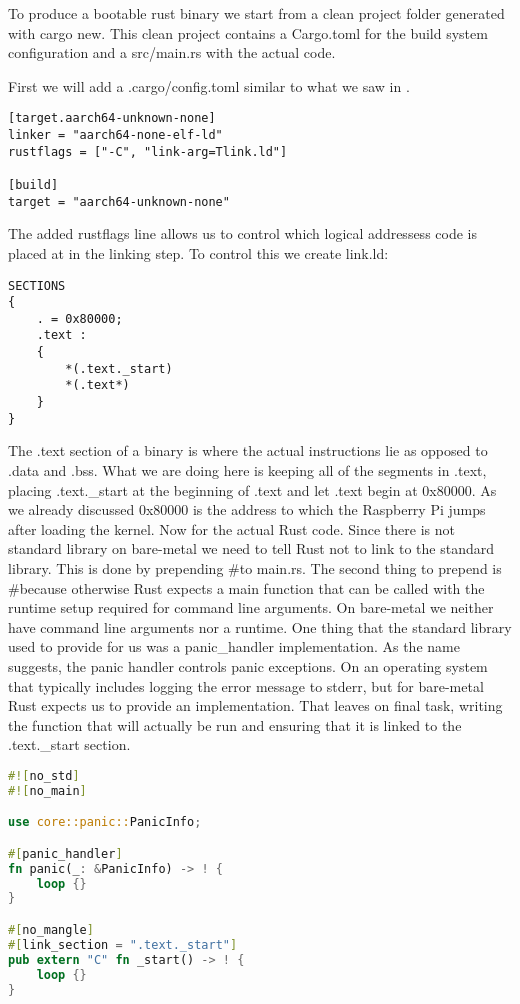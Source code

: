 To produce a bootable rust binary we start from a clean project folder generated with cargo new.
This clean project contains a Cargo.toml for the build system configuration and a src/main.rs with the actual code.

First we will add a .cargo/config.toml similar to what we saw in .
\begin{lstlisting}
[target.aarch64-unknown-none]
linker = "aarch64-none-elf-ld"
rustflags = ["-C", "link-arg=Tlink.ld"]
    
[build]
target = "aarch64-unknown-none"
\end{lstlisting}
The added rustflags line allows us to control which logical addressess code is placed at in the linking step.
To control this we create link.ld:
\begin{lstlisting}
SECTIONS
{
    . = 0x80000;
    .text :
    {
        *(.text._start)
        *(.text*)
    }
}
\end{lstlisting}
The .text section of a binary is where the actual instructions lie as opposed to .data and .bss.
What we are doing here is keeping all of the segments in .text, placing .text.\_start at the beginning of .text and let .text begin at 0x80000.
As we already discussed 0x80000 is the address to which the Raspberry Pi jumps after loading the kernel.
Now for the actual Rust code. Since there is not standard library on bare-metal we need to tell Rust not to link to the standard library.
This is done by prepending \#\![no\_std] to main.rs.
The second thing to prepend is \#\![no\_main] because otherwise Rust expects a main function that can be called with the runtime setup required for command line arguments.
On bare-metal we neither have command line arguments nor a runtime.
One thing that the standard library used to provide for us was a panic\_handler implementation.
As the name suggests, the panic handler controls panic exceptions.
On an operating system that typically includes logging the error message to stderr, but for bare-metal Rust expects us to provide an implementation.
That leaves on final task, writing the function that will actually be run and ensuring that it is linked to the .text.\_start section.
\begin{lstlisting}[language=Rust,style=colouredRust]
#![no_std]
#![no_main]

use core::panic::PanicInfo;

#[panic_handler]
fn panic(_: &PanicInfo) -> ! {
    loop {}
}

#[no_mangle]
#[link_section = ".text._start"]
pub extern "C" fn _start() -> ! {
	loop {}
}
\end{lstlisting}


